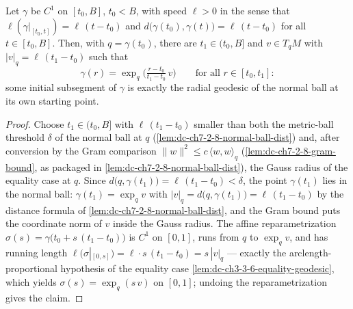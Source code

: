 \begin{lemma}
  \label{lem:dc-ch3-3-9-anchored}


  Let $\gamma$ be $C^1$ on $[t_0,B]$, $t_0<B$, with speed $\ell>0$ in the
  sense that $\ell(\gamma|_{[t_0,t]})=\ell\,(t-t_0)$ and
  $d\big(\gamma(t_0),\gamma(t)\big)=\ell\,(t-t_0)$ for all $t\in[t_0,B]$.
  Then, with $q=\gamma(t_0)$, there are $t_1\in(t_0,B]$ and $v\in T_qM$ with
  $|v|_q=\ell\,(t_1-t_0)$ such that
  $$\gamma(r)=\exp_q\Big(\tfrac{r-t_0}{t_1-t_0}\,v\Big)
    \qquad\text{for all } r\in[t_0,t_1]:$$
  some initial subsegment of $\gamma$ is exactly the radial geodesic of the
  normal ball at its own starting point.
\end{lemma}
\begin{proof}
  \sketch

  Choose $t_1\in(t_0,B]$ with $\ell\,(t_1-t_0)$ smaller than both the
  metric-ball threshold $\delta$ of the normal ball at $q$
  (\cref{lem:dc-ch7-2-8-normal-ball-dist}) and, after conversion by the Gram
  comparison $\|w\|^2\le c\,\langle w,w\rangle_q$
  (\cref{lem:dc-ch7-2-8-gram-bound}, as packaged in
  \cref{lem:dc-ch7-2-8-normal-ball-dist}), the Gauss radius of the equality
  case at $q$. Since $d\big(q,\gamma(t_1)\big)=\ell\,(t_1-t_0)<\delta$, the point
  $\gamma(t_1)$ lies in the normal ball: $\gamma(t_1)=\exp_q v$ with
  $|v|_q=d\big(q,\gamma(t_1)\big)=\ell\,(t_1-t_0)$ by the distance formula
  of \cref{lem:dc-ch7-2-8-normal-ball-dist}, and the Gram bound puts the
  coordinate norm of $v$ inside the Gauss radius. The affine
  reparametrization $\sigma(s)=\gamma\big(t_0+s\,(t_1-t_0)\big)$ is $C^1$ on
  $[0,1]$, runs from $q$ to $\exp_q v$, and has running length
  $\ell(\sigma|_{[0,s]})=\ell\cdot s\,(t_1-t_0)=s\,|v|_q$ — exactly the
  arclength-proportional hypothesis of the equality case
  \cref{lem:dc-ch3-3-6-equality-geodesic}, which yields
  $\sigma(s)=\exp_q(s\,v)$ on $[0,1]$; undoing the reparametrization gives
  the claim.
\end{proof}

